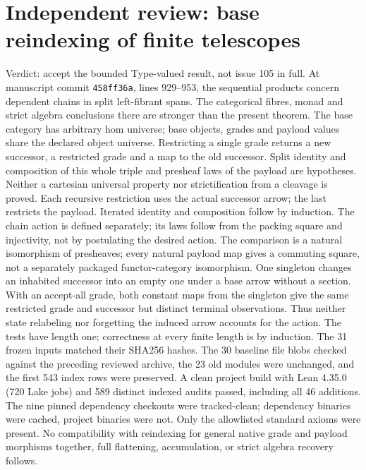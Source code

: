 \documentclass{article}
\begin{document}
\section*{Independent review: base reindexing of finite telescopes}
Verdict: accept the bounded Type-valued result, not issue 105 in full.
At manuscript commit \texttt{458ff36a}, lines 929--953, the sequential products concern dependent chains in split left-fibrant spans. The categorical fibres, monad and strict algebra conclusions there are stronger than the present theorem.
The base category has arbitrary hom universe; base objects, grades and payload values share the declared object universe. Restricting a single grade returns a new successor, a restricted grade and a map to the old successor. Split identity and composition of this whole triple and presheaf laws of the payload are hypotheses. Neither a cartesian universal property nor strictification from a cleavage is proved. Each recursive restriction uses the actual successor arrow; the last restricts the payload. Iterated identity and composition follow by induction. The chain action is defined separately; its laws follow from the packing square and injectivity, not by postulating the desired action. The comparison is a natural isomorphism of presheaves; every natural payload map gives a commuting square, not a separately packaged functor-category isomorphism.
One singleton changes an inhabited successor into an empty one under a base arrow without a section. With an accept-all grade, both constant maps from the singleton give the same restricted grade and successor but distinct terminal observations. Thus neither state relabeling nor forgetting the induced arrow accounts for the action. The tests have length one; correctness at every finite length is by induction.
The 31 frozen inputs matched their SHA256 hashes. The 30 baseline file blobs checked against the preceding reviewed archive, the 23 old modules were unchanged, and the first 543 index rows were preserved. A clean project build with Lean 4.35.0 (720 Lake jobs) and 589 distinct indexed audits passed, including all 46 additions. The nine pinned dependency checkouts were tracked-clean; dependency binaries were cached, project binaries were not. Only the allowlisted standard axioms were present. No compatibility with reindexing for general native grade and payload morphisms together, full flattening, accumulation, or strict algebra recovery follows.
\end{document}
